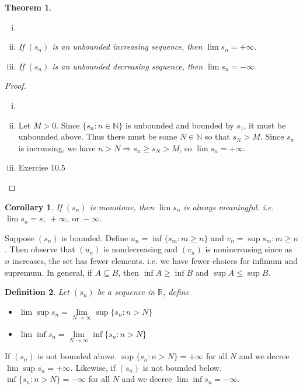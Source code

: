\documentclass[12pt, lettersize]{book}
\newtheorem{thm}{Theorem}[section]
\newtheorem{dfn}[thm]{Definition}
\newtheorem{cor}{Corollary}[thm]
\begin{document}
		\begin{thm}\label{def:unbounded monotone seq}
		\begin{enumerate}[(i)]
			\item[]
			\item If $(s_n)$ is an unbounded increasing sequence, then $\lim s_n=+\infty$.
			\item If $(s_n)$ is an unbounded decreasing sequence, then $\lim s_n=-\infty$.
		\end{enumerate}
		\end{thm}
		\begin{proof}
		\begin{enumerate}[(i)]
			\item[]
			\item Let $M>0$. Since $\{s_n: n\in\mathbb{N}\}$ is unbounded and bounded by $s_1$, it must be unbounded above.
			Thus there must be some $N\in\mathbb{N}$ so that $s_N>M$. Since $s_n$ is increasing, we have $n>N\Rightarrow s_n\geq s_N>M$, so $\lim s_n=+\infty$. 
			\item Exercise 10.5
		\end{enumerate}
		\end{proof}
		\begin{cor}
		If $(s_n)$ is monotone, then $\lim s_n$ is always meaningful. i.e. $\lim s_n=s,\ +\infty,\ \text{or}\ -\infty$.
		\end{cor}
	
		Suppose $(s_n)$ is bounded. Define $u_n=\inf\{s_m: m\geq n\}$ and $v_n=\sup{s_m: m\geq n}$. Then observe that $(u_n)$ is nondecreasing and $(v_n)$ is nonincreasing since as $n$ increases, the set has fewer elements. i.e. we have fewer choices for infimum and supremum. In general, if $A\subseteq B$, then $\inf A\geq \inf B$ and $\sup A\leq \sup B$.
		
		\begin{dfn}
		Let $(s_n)$ be a sequence in $\mathbb{R}$, define
		\begin{itemize}
			\item $\lim\sup s_n=\lim\limits_{N\rightarrow\infty}\sup\{s_n: n>N\}$
			\item $\lim\inf s_n=\lim\limits_{N\rightarrow\infty}\inf\{s_n: n>N\}$
		\end{itemize}
		\end{dfn}
		If $(s_n)$ is not bounded above. $\sup\{s_n: n>N\}=+\infty$ for all $N$ and we decree $\lim\sup s_n=+\infty$.
		Likewise, if $(s_n)$ is not bounded below. $\inf\{s_n: n>N\}=-\infty$ for all $N$ and we decree $\lim\inf s_n=-\infty$.
		
\end{document}
